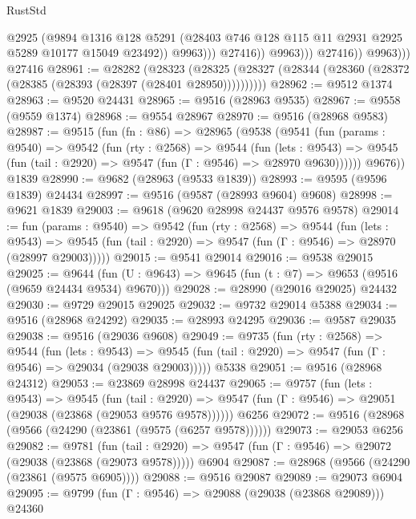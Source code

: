 \begin{lexlean}{RustStd}
\begin{coremodule}
                              @2925
                              (@9894
                                @1316
                                @128
                                @5291
                                (@28403 @746 @128 @115 @11 @2931 @2925 @5289 @10177 @15049 @23492))
                              @9963)))
                        @27416))
                    @9963)))
              @27416))
          @9963)))
    @27416
@28961 := @28282
    (@28323 (@28325 (@28327 (@28344 (@28360 (@28372 (@28385 (@28393 (@28397 (@28401 @28950))))))))))
@28962 := @9512 @1374
@28963 := @9520 @24431
@28965 := @9516 (@28963 @9535)
@28967 := @9558 (@9559 @1374)
@28968 := @9554 @28967
@28970 := @9516 (@28968 @9583)
@28987 := @9515
    (fun (fn : @86) =>
    @28965
      (@9538
        (@9541
          (fun (params : @9540) =>
          @9542
            (fun (rty : @2568) =>
            @9544
              (fun (lets : @9543) =>
              @9545 (fun (tail : @2920) => @9547 (fun (Γ : @9546) => @28970 @9630))))))
        @9676))
    @1839
@28990 := @9682 (@28963 (@9533 @1839))
@28993 := @9595 (@9596 @1839) @24434
@28997 := @9516 (@9587 (@28993 @9604) @9608)
@28998 := @9621 @1839
@29003 := @9618 (@9620 @28998 @24437 @9576 @9578)
@29014 := fun (params : @9540) =>
  @9542
    (fun (rty : @2568) =>
    @9544
      (fun (lets : @9543) =>
      @9545 (fun (tail : @2920) => @9547 (fun (Γ : @9546) => @28970 (@28997 @29003)))))
@29015 := @9541 @29014
@29016 := @9538 @29015
@29025 := @9644
    (fun (U : @9643) => @9645 (fun (t : @7) => @9653 (@9516 (@9659 @24434 @9534) @9670)))
@29028 := @28990 (@29016 @29025) @24432
@29030 := @9729 @29015 @29025
@29032 := @9732 @29014 @5388
@29034 := @9516 (@28968 @24292)
@29035 := @28993 @24295
@29036 := @9587 @29035
@29038 := @9516 (@29036 @9608)
@29049 := @9735
    (fun (rty : @2568) =>
    @9544
      (fun (lets : @9543) =>
      @9545 (fun (tail : @2920) => @9547 (fun (Γ : @9546) => @29034 (@29038 @29003)))))
    @5338
@29051 := @9516 (@28968 @24312)
@29053 := @23869 @28998 @24437
@29065 := @9757
    (fun (lets : @9543) =>
    @9545
      (fun (tail : @2920) =>
      @9547 (fun (Γ : @9546) => @29051 (@29038 (@23868 (@29053 @9576 @9578))))))
    @6256
@29072 := @9516 (@28968 (@9566 (@24290 (@23861 (@9575 (@6257 @9578))))))
@29073 := @29053 @6256
@29082 := @9781
    (fun (tail : @2920) => @9547 (fun (Γ : @9546) => @29072 (@29038 (@23868 (@29073 @9578)))))
    @6904
@29087 := @28968 (@9566 (@24290 (@23861 (@9575 @6905))))
@29088 := @9516 @29087
@29089 := @29073 @6904
@29095 := @9799 (fun (Γ : @9546) => @29088 (@29038 (@23868 @29089))) @24360

\end{coremodule}
\end{lexlean}
